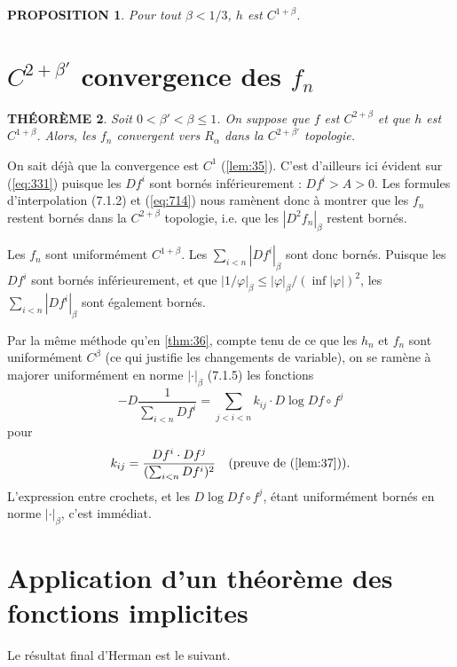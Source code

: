 \documentclass[12pt]{amsart}
\theoremstyle{plain}
\newtheorem{theoreme}{TH\'{E}OR\`{E}ME}[section]
\newtheorem{proposition}[theoreme]{PROPOSITION}
\theoremstyle{remark}
\begin{document}
\begin{proposition}\label{prop:75}
Pour tout $\beta < 1/3$, $h$ est $C^{1+\beta}$.
\end{proposition}

\section{$C^{2+\beta'}$ convergence des $f_{n}$}

\begin{theoreme}\label{thm:81}
Soit $0 < \beta' < \beta \leq 1$. On suppose que $f$ est $C^{2+\beta}$ et que $h$ est $C^{1+\beta}$. Alors, les $f_{n}$ convergent vers $R_{\alpha}$ dans la $C^{2+\beta'}$ topologie.
\end{theoreme}

On sait d\'{e}j\`{a} que la convergence est $C^{1}$ (\ref{lem:35}). C'est d'ailleurs ici \'{e}vident sur (\ref{eq:331}) puisque les $Df^{i}$ sont born\'{e}s inf\'{e}rieurement : $Df^{i} > A > 0$. Les formules d'interpolation (7.1.2) et (\ref{eq:714}) nous ram\`{e}nent donc \`{a} montrer que les $f_{n}$ restent born\'{e}s dans la $C^{2+\beta}$ topologie, i.e. que les $|D^{2}f_{n}|_{\beta}$ restent born\'{e}s.

Les $f_{n}$ sont uniform\'{e}ment $C^{1+\beta}$. Les $\sum_{i < n} |Df^{i}|_{\beta}$ sont donc born\'{e}s. Puisque les $Df^{i}$ sont born\'{e}s inf\'{e}rieurement, et que $|1/\varphi|_{\beta} \leq |\varphi|_{\beta}/(\inf|\varphi|)^{2}$, les $\sum_{i < n} |Df^{i}|_{\beta}$ sont \'{e}galement born\'{e}s.

Par la m\^{e}me m\'{e}thode qu'en \ref{thm:36}, compte tenu de ce que les $h_{n}$ et $f_{n}$ sont uniform\'{e}ment $C^{\beta}$ (ce qui justifie les changements de variable), on se ram\`{e}ne \`{a} majorer uniform\'{e}ment en norme $|\cdot|_{\beta}$ (7.1.5) les fonctions
\[
-D\frac{1}{\sum_{i < n} Df^{i}} = \sum_{j < i < n} k_{ij} \cdot D\log Df \circ f^{j}
\]
pour
\[
k_{ij} = \frac{Df^{i} \cdot Df^{j}}{(\sum_{i < n} Df^{i})^{2}} \quad \text{(preuve de (\ref{lem:37}))} .
\]
L'expression entre crochets, et les $D\log Df \circ f^{j}$, \'{e}tant uniform\'{e}ment born\'{e}s en norme $|\cdot|_{\beta}$, c'est imm\'{e}diat.

\section{Application d'un th\'{e}or\`{e}me des fonctions implicites}

Le r\'{e}sultat final d'Herman est le suivant.
\end{document}
